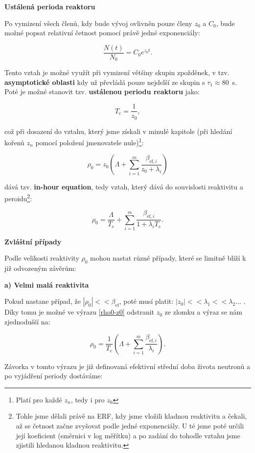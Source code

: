 \textbf{Ustálená perioda reaktoru}

Po vymizení všech členů, kdy bude vývoj ovlivněn pouze členy $z_0$ a $C_0$, bude možné popsat relativní četnost pomocí právě jedné exponenciály:

$$ \dfrac{N(t)}{N_0} = C_0 e^{z_0 t}. $$

Tento vztah je možné využít při vymizení většiny skupin zpožděnek, v tzv. \textbf{asymptotické oblasti} kdy už převládá pouze nejdelší ze skupin s $\tau_1 \approx 80$~s. Poté je možné stanovit tzv. \textbf{ustálenou periodu reaktoru} jako:

$$ T_e = \dfrac{1}{z_0}, $$

což při dosazení do vztahu, který jsme získali v minulé kapitole (při hledání kořenů $z_n$ pomocí položení jmenovatele nule)\footnote{Platí pro každé $z_n$, tedy i pro $z_0$}:

\begin{equation}
  \rho_0 = z_0 \left ( \Lambda + \sum_{i = 1}^m \dfrac{\beta_{\text{ef},i}}{z_0 + \lambda_i} \right )
  \label{rho0-z0}
\end{equation}

dává tzv. \textbf{in-hour equation}, tedy vztah, který dává do souvislosti reaktivitu a peroidu\footnote{Tohle jsme dělali právě na ERF, kdy jsme vložili kladnou reaktivitu a čekali, až se četnost začne zvyšovat podle jedné exponenciály. U té jsme poté určili její koeficient (směrnici v log měřítku) a po zadání do tohodle vztahu jsme zjistili hledanou kladnou reaktivitu.}:

\begin{equation}
  \boxed{
  \rho_0 = \dfrac{\Lambda}{T_e} + \sum_{i=1}^{m} \dfrac{\beta_{\text{ef},i}}{1 + \lambda_i T_e}.
  \label{in-hour}}
\end{equation}

\textbf{Zvláštní případy}

Podle velikosti reaktivity $\rho_0$ mohou nastat různé případy, které se limitně blíží k již odvozeným závěrům:

\textbf{a) Velmi malá reaktivita}

Pokud nastane případ, že $|\rho_0| << \beta_{\text{ef}}$, poté musí platit: $|z_0| << \lambda_1 << \lambda_2 ...$ . Díky tomu je možné ve výrazu \eqref{rho0-z0} odstranit $z_0$ ze zlomku a výraz se nám zjednodušší na:

$$ \rho_0 = \dfrac{1}{T_e} \left ( \Lambda + \sum_{i=1}^m \dfrac{\beta_{\text{ef},i}}{\lambda_i} \right ). $$

Závorka v tomto výrazu je již definovaná efektivní střední doba života neutronů a po vyjádření periody dostáváme:

